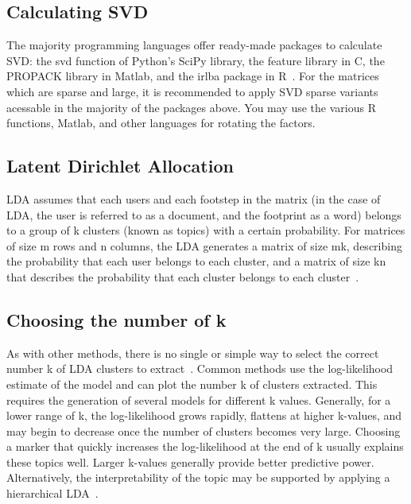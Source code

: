 \subsection{Calculating SVD~\cite{hid515-12}}

The majority programming languages offer ready-made packages to 
calculate SVD: the svd function of Python's SciPy library, the 
feature library in C, the PROPACK library in Matlab, and the 
irlba package in R~\cite{hid515-12}. 
For the matrices which are sparse and large, it is 
recommended to apply SVD sparse variants acessable in the majority
 of the packages above. 
You may use the various R functions, Matlab, and other languages 
for rotating the factors.

\subsection{Latent Dirichlet Allocation~\cite{hid515-12}}

LDA assumes that each users and each footstep in the matrix (in the
 case of LDA, the user is referred to as a document, and the 
footprint as a word) belongs to a group of k clusters (known as 
topics) with a certain probability. For matrices of size m rows and
 n columns, the LDA generates a matrix of size mk, describing the 
probability that each user belongs to each cluster, and a matrix of
 size kn that describes the probability that each cluster belongs 
to each cluster~\cite{hid515-12}. 

\subsection{Choosing the number of k~\cite{hid515-12}}

As with other methods, there is no single or simple way to select 
the correct number k of LDA clusters to extract~\cite{hid515-12}. 
Common methods use
 the log-likelihood estimate of the model and can plot the number k
 of clusters extracted. This requires the generation of several 
models for different k values. Generally, for a lower range of k, 
the log-likelihood grows rapidly, flattens at higher k-values, and
 may begin to decrease once the number of clusters becomes very 
large. Choosing a marker that quickly increases the log-likelihood
 at the end of k usually explains these topics well. Larger 
k-values generally provide better predictive power. Alternatively,
 the interpretability of the topic may be supported by applying a 
hierarchical LDA~\cite{hid515-12}.

